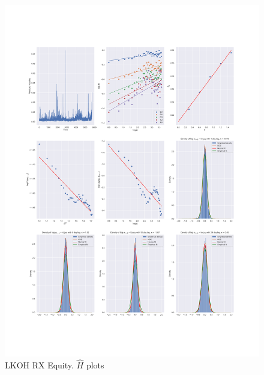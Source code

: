 \begin{figure}[h]
    \centering
    \includegraphics[width=\linewidth]{fig/LKOH RX Equity.pdf}
    \caption{LKOH RX Equity. $\hat{H}$ plots}
\end{figure} 
    

